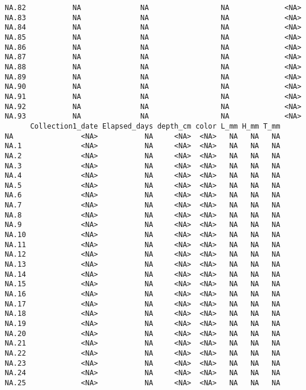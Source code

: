 \documentclass[
  letterpaper,
  DIV=11,
  numbers=noendperiod]{scrartcl}
\begin{document}
\begin{verbatim}
NA.82           NA              NA                 NA             <NA>
NA.83           NA              NA                 NA             <NA>
NA.84           NA              NA                 NA             <NA>
NA.85           NA              NA                 NA             <NA>
NA.86           NA              NA                 NA             <NA>
NA.87           NA              NA                 NA             <NA>
NA.88           NA              NA                 NA             <NA>
NA.89           NA              NA                 NA             <NA>
NA.90           NA              NA                 NA             <NA>
NA.91           NA              NA                 NA             <NA>
NA.92           NA              NA                 NA             <NA>
NA.93           NA              NA                 NA             <NA>
      Collection1_date Elapsed_days depth_cm color L_mm H_mm T_mm
NA                <NA>           NA     <NA>  <NA>   NA   NA   NA
NA.1              <NA>           NA     <NA>  <NA>   NA   NA   NA
NA.2              <NA>           NA     <NA>  <NA>   NA   NA   NA
NA.3              <NA>           NA     <NA>  <NA>   NA   NA   NA
NA.4              <NA>           NA     <NA>  <NA>   NA   NA   NA
NA.5              <NA>           NA     <NA>  <NA>   NA   NA   NA
NA.6              <NA>           NA     <NA>  <NA>   NA   NA   NA
NA.7              <NA>           NA     <NA>  <NA>   NA   NA   NA
NA.8              <NA>           NA     <NA>  <NA>   NA   NA   NA
NA.9              <NA>           NA     <NA>  <NA>   NA   NA   NA
NA.10             <NA>           NA     <NA>  <NA>   NA   NA   NA
NA.11             <NA>           NA     <NA>  <NA>   NA   NA   NA
NA.12             <NA>           NA     <NA>  <NA>   NA   NA   NA
NA.13             <NA>           NA     <NA>  <NA>   NA   NA   NA
NA.14             <NA>           NA     <NA>  <NA>   NA   NA   NA
NA.15             <NA>           NA     <NA>  <NA>   NA   NA   NA
NA.16             <NA>           NA     <NA>  <NA>   NA   NA   NA
NA.17             <NA>           NA     <NA>  <NA>   NA   NA   NA
NA.18             <NA>           NA     <NA>  <NA>   NA   NA   NA
NA.19             <NA>           NA     <NA>  <NA>   NA   NA   NA
NA.20             <NA>           NA     <NA>  <NA>   NA   NA   NA
NA.21             <NA>           NA     <NA>  <NA>   NA   NA   NA
NA.22             <NA>           NA     <NA>  <NA>   NA   NA   NA
NA.23             <NA>           NA     <NA>  <NA>   NA   NA   NA
NA.24             <NA>           NA     <NA>  <NA>   NA   NA   NA
NA.25             <NA>           NA     <NA>  <NA>   NA   NA   NA

\end{verbatim}
\end{document}
